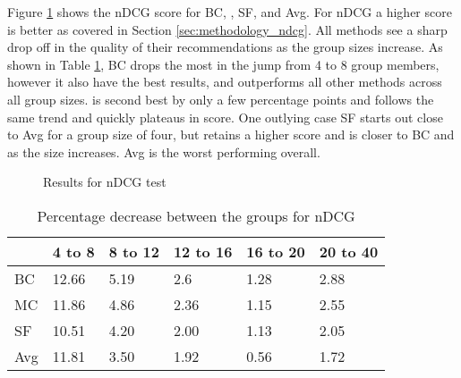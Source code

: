 Figure \ref{fig:ndcg} shows the nDCG score for BC, \MC, SF, and Avg. For nDCG a higher score is better as covered in Section \ref{sec:methodology_ndcg}.
All methods see a sharp drop off in the quality of their recommendations as the group sizes increase.
As shown in Table \ref{tbl:ndcg}, BC drops the most in the jump from 4 to 8 group members, however it also have the best results, and outperforms all other methods across all group sizes.
\MC is second best by only a few percentage points and follows the same trend and quickly plateaus in score.
One outlying case SF starts out close to Avg for a group size of four, but retains a higher score and is closer to BC and \MC as the size increases.
Avg is the worst performing overall.

\begin{figure}[H]
	\caption{Results for nDCG test}\label{fig:ndcg}
\end{figure}

\begin{table}[H]
	\centering
	\label{tbl:ndcg}
	\begin{tabular}{|l|lllll|}\hline
		& 4 to 8 & 8 to 12 & 12 to 16 & 16 to 20 & 20 to 40 \\\hline
		BC 	& 12.66	& 5.19	& 2.6	& 1.28	& 2.88 \\
		MC  & 11.86	& 4.86	& 2.36	& 1.15	& 2.55 \\
		SF  & 10.51	& 4.20	& 2.00	& 1.13	& 2.05 \\
		Avg	& 11.81	& 3.50 	& 1.92	& 0.56	& 1.72 \\ \hline
	\end{tabular}
	\caption{Percentage decrease between the groups for nDCG}
\end{table}